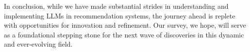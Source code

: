 \documentclass[sn-mathphys-num]{sn-jnl}%
\theoremstyle{thmstyleone}%
\theoremstyle{thmstyletwo}%
\theoremstyle{thmstylethree}%
\begin{document}
In conclusion, while we have made substantial strides in understanding and implementing LLMs in recommendation systems, the journey ahead is replete with opportunities for innovation and refinement. Our survey, we hope, will serve as a foundational stepping stone for the next wave of discoveries in this dynamic and ever-evolving field.










\end{document}
